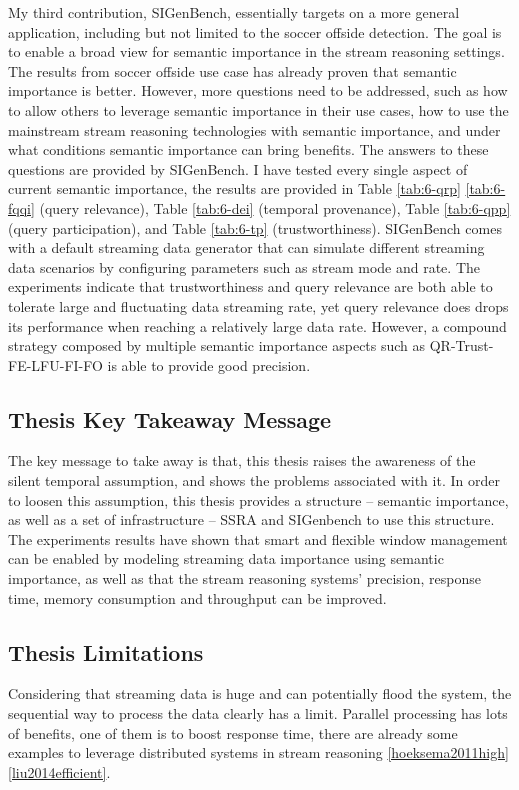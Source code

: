 My third contribution, SIGenBench, essentially targets on a more general application, including but not limited to the soccer offside detection. 
The goal is to enable a broad view for semantic importance in the stream reasoning settings. 
The results from soccer offside use case has already proven that semantic importance is better. 
However, more questions need to be addressed, such as how to allow others to leverage semantic importance in their use cases, how to use the mainstream stream reasoning technologies with semantic importance, and under what conditions semantic importance can bring benefits. 
The answers to these questions are provided by SIGenBench. 
I have tested every single aspect of current semantic importance, the results are provided in Table \ref{tab:6-qrp} \ref{tab:6-fqqi} (query relevance), Table \ref{tab:6-dei} (temporal provenance), Table \ref{tab:6-qpp} (query participation), and Table \ref{tab:6-tp} (trustworthiness). 
SIGenBench comes with a default streaming data generator that can simulate different streaming data scenarios by configuring parameters such as stream mode and rate. 
The experiments indicate that trustworthiness and query relevance are both able to tolerate large and fluctuating data streaming rate, yet query relevance does drops its performance when reaching a relatively large data rate. 
However, a compound strategy composed by multiple semantic importance aspects such as QR-Trust-FE-LFU-FI-FO is able to provide good precision.
%
\subsection{Thesis Key Takeaway Message}
The key message to take away is that, this thesis raises the awareness of the silent temporal assumption, and shows the problems associated with it. 
In order to loosen this assumption, this thesis provides a structure -- semantic importance, as well as a set of infrastructure -- SSRA and SIGenbench to use this structure. 
The experiments results have shown that smart and flexible window management can be enabled by modeling streaming data importance using semantic importance, as well as that the stream reasoning systems' precision, response time, memory consumption and throughput can be improved.
%
\subsection{Thesis Limitations}
Considering that streaming data is huge and can potentially flood the system, the sequential way to process the data clearly has a limit. 
Parallel processing has lots of benefits, one of them is to boost response time, there are already some examples to leverage distributed systems in stream reasoning \ref{hoeksema2011high} \ref{liu2014efficient}. 

